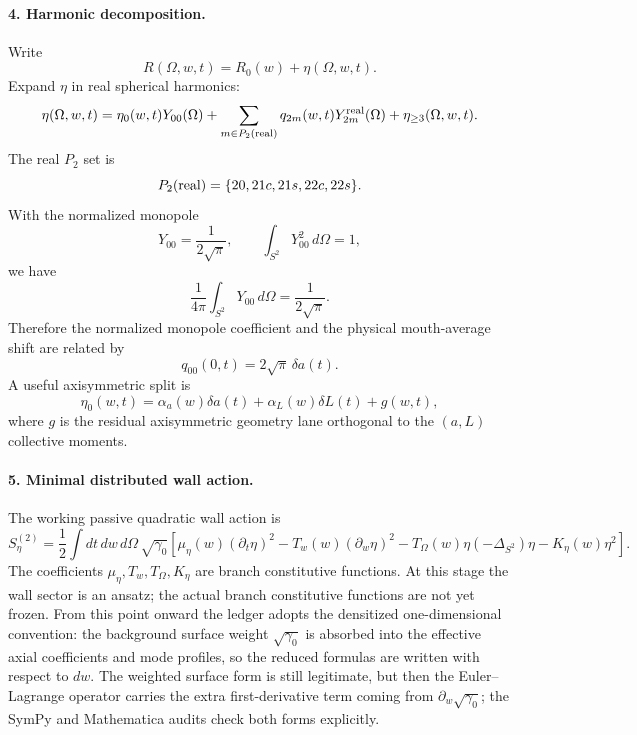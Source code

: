 \paragraph{4. Harmonic decomposition.}
Write
\begin{equation}
\label{eq:app-stage001-wall-perturbation}
R(\Omega,w,t)=R_0(w)+\eta(\Omega,w,t).
\end{equation}
Expand \(\eta\) in real spherical harmonics:
\begin{equation}
\label{eq:app-stage001-harmonic-expansion}
\eta(\Omega,w,t)
=\eta_0(w,t)Y_{00}(\Omega)
+\sum_{m\in P_2({\rm real})}q_{2m}(w,t)Y^{\rm real}_{2m}(\Omega)
+\eta_{\ge3}(\Omega,w,t).
\end{equation}
The real \(P_2\) set is
\begin{equation}
\label{eq:app-stage001-p2-set}
P_2({\rm real})=\{20,21c,21s,22c,22s\}.
\end{equation}
With the normalized monopole
\begin{equation}
Y_{00}=\frac{1}{2\sqrt\pi},
\qquad
\int_{S^2}Y_{00}^2\,d\Omega=1,
\end{equation}
we have
\begin{equation}
\frac{1}{4\pi}\int_{S^2}Y_{00}\,d\Omega=\frac{1}{2\sqrt\pi}.
\end{equation}
Therefore the normalized monopole coefficient and the physical mouth-average shift are related by
\begin{equation}
\label{eq:app-stage001-q00-da}
q_{00}(0,t)=2\sqrt\pi\,\delta a(t).
\end{equation}
A useful axisymmetric split is
\begin{equation}
\label{eq:app-stage001-axisymmetric-split}
\eta_0(w,t)=\alpha_a(w)\delta a(t)+\alpha_L(w)\delta L(t)+g(w,t),
\end{equation}
where \(g\) is the residual axisymmetric geometry lane orthogonal to the \((a,L)\) collective moments.

\paragraph{5. Minimal distributed wall action.}
The working passive quadratic wall action is
\begin{equation}
\label{eq:app-stage001-wall-action}
S_{\eta}^{(2)}
=\frac12\int dt\,dw\,d\Omega\,\sqrt{\gamma_0}
\left[
\mu_\eta(w)(\partial_t\eta)^2
-T_w(w)(\partial_w\eta)^2
-T_\Omega(w)\eta(-\Delta_{S^2})\eta
-K_\eta(w)\eta^2
\right].
\end{equation}
The coefficients \(\mu_\eta,T_w,T_\Omega,K_\eta\) are branch constitutive functions.  At this stage the wall sector is an ansatz; the actual branch constitutive functions are not yet frozen.  From this point onward the ledger adopts the densitized one-dimensional convention: the background surface weight \(\sqrt{\gamma_0}\) is absorbed into the effective axial coefficients and mode profiles, so the reduced formulas are written with respect to \(dw\).  The weighted surface form is still legitimate, but then the Euler--Lagrange operator carries the extra first-derivative term coming from \(\partial_w\sqrt{\gamma_0}\); the SymPy and Mathematica audits check both forms explicitly.

